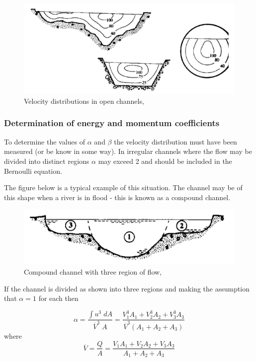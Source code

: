 \documentclass[a4paper, 12pt, british]{article} %
\numberwithin{equation}{section}
\numberwithin{figure}{section}
\numberwithin{table}{section}
\begin{document}
 \begin{figure}[H]
	\centering
	\includegraphics[scale=0.5,angle=2]{./images/fig_142.png}
	\caption{Velocity distributions in open channels, \cite{chadwick}}
	\label{fig:142}
\end{figure}

\subsubsection{Determination of energy and momentum coefficients}

To determine the values of $\alpha$ and $\beta$ the velocity distribution must have been measured (or be know in some way). In irregular channels where the flow may be divided into distinct regions $\alpha$ may exceed 2 and should be included in the Bernoulli equation.

The figure below is a typical example of this situation. The channel may be of this shape when a river is in flood - this is known as a compound channel. 

 \begin{figure}[H]
	\centering
	\includegraphics[scale=0.5]{./images/fig_151.png}
	\caption{Compound channel with three region of flow, \cite{chadwick}}
	\label{fig:151}
\end{figure}

If the channel is divided as shown into three regions and making the assumption that $\alpha = 1$ for each then

\begin{equation}
\alpha = \frac{\int u^3 \; dA}{\overline{V}^3 \; A} = \frac{V_1^3 A_1+ V_2^3 A_2+V_3^3 A_3}{\overline{V}^3(A_1+A_2+A_3)} 
\end{equation}
where
\begin{equation}
\overline{V} = \frac{Q}{A} = \frac{V_1 A_1+ V_2 A_2+V_3 A_3}{A_1+A_2+A_3} 
\end{equation} 
\end{document}
